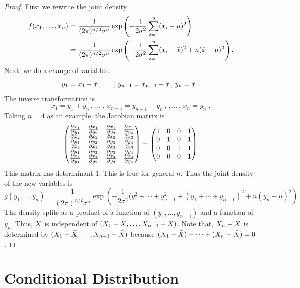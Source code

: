 \begin{proof}
First we rewrite the joint density
\begin{align*}
f(x_1,\ldots,x_n) ={} & \frac{1}{(2\pi)^{n/2}\sigma^n}
\exp\left(-\frac{1}{2\sigma^2}\sum_{i=1}^n(x_i-\mu)^2\right)\\
={} & \frac{1}{(2\pi)^{n/2}\sigma^n}
\exp\left(-\frac{1}{2\sigma^2}
\sum_{i=1}^n(x_i-\Bar{x})^2+n(\Bar{x}-\mu)^2\right).
\end{align*}
Next, we do a change of variables.
\[
y_1 = x_1 - \Bar{x}\,,\, \ldots \,,\, y_{n-1} = x_{n-1} - \Bar{x} \,,\, y_n = \Bar{x} \;.
\]
The inverse transformation is
\[
x_1 = y_1+y_n \,,\, \ldots \;,\, x_{n-1}=y_{n-1}+y_n \,,\,, \ldots \,,\, x_n=y_n \;.
\]
Taking $n=4$ as an example, the Jacobian matrix is
{
\renewcommand{\arraystretch}{1.5}
\setlength{\arraycolsep}{10pt}
\[
\begin{pmatrix}
\frac{\partial x_{1}}{\partial y_{1}} & \frac{\partial x_{1}}{\partial y_{2}} & \frac{\partial x_{1}}{\partial y_{3}} & \frac{\partial x_{1}}{\partial y_{4}} \\  
\frac{\partial x_{2}}{\partial y_{1}} & \frac{\partial x_{2}}{\partial y_{2}} & \frac{\partial x_{2}}{\partial y_{3}} & \frac{\partial x_{2}}{\partial y_{4}} \\  
\frac{\partial x_{3}}{\partial y_{1}} & \frac{\partial x_{3}}{\partial y_{2}} & \frac{\partial x_{3}}{\partial y_{3}} & \frac{\partial x_{3}}{\partial y_{4}} \\  
\frac{\partial x_{4}}{\partial y_{1}} & \frac{\partial x_{4}}{\partial y_{2}} & \frac{\partial x_{4}}{\partial y_{3}} & \frac{\partial x_{4}}{\partial y_{4}} \\  
\end{pmatrix}
= 
\begin{pmatrix}
1 & 0 & 0 & 1\\
0 & 1 & 0 & 1\\
0 & 0 & 1 & 1\\
0 & 0 & 0 & 1
\end{pmatrix}
\]
}
This matrix has determinant $1$. This is true for general $n$. Thus the joint density of the new variables is
\[
g(y_1,\ldots,y_n) = \frac{1}{(2\pi)^{n/2}\sigma^n}
\exp\left(-\frac{1}{2\sigma^2}(y_1^2+\cdots+y_{n-1}^2+(y_1+\cdots+y_{n-1})^2 + n(y_n-\mu)^2\right)
\]
The density splits as a product of a function of $(y_1,\ldots,y_{n-1})$ and a function of $y_n$. Thus, $\Bar{X}$ is independent of $(X_1-\Bar{X},\ldots,X_{n-1}-\Bar{X})$. Note that, $X_n-\Bar{X}$ is determined by $(X_1-\Bar{X},\ldots,X_{n-1}-\Bar{X})$ because $(X_1-\Bar{X})+\cdots+(X_n-\Bar{X})=0$.
\end{proof}

\newpage


\section{Conditional Distribution}

